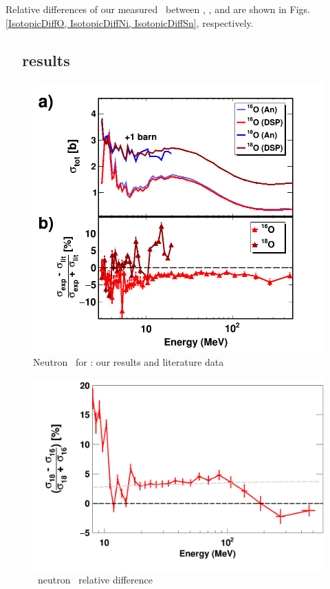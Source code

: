 Relative differences of our measured \tot\ between \oSixEight, \niEightFour, and
\snTwelveFour are shown in Figs. \ref{IsotopicDiffO, IsotopicDiffNi, 
IsotopicDiffSn}, respectively. 

\subsection{\oSixEight\ \tot\ results}
\begin{figure}
    \includegraphics[scale=0.35]{figures/TwoPanelO.png}
    \caption{Neutron \tot\ for \oSixEight: our results and literature data}
    \label{TwoPanelO}
\end{figure}

        \cite{Finlay1993, Perey1972, Vaughn1965, Salisbury1965}

\begin{figure}
    \includegraphics[scale=0.35]{figures/relativeDiff_O18O16.png}
    \caption{\oSixEight\ neutron \tot\ relative difference}
    \label{IsotopicDifferenceO}
\end{figure}

